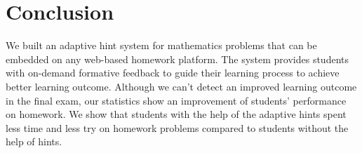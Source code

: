 \documentclass{llncs}
\begin{document}
\section{Conclusion}
We built an adaptive hint system for mathematics problems that can be embedded on any web-based homework platform. The system provides students with on-demand formative feedback to guide their learning process to achieve better learning outcome. Although we can't detect an improved learning outcome in the final exam, our statistics show an improvement of students' performance on homework. We show that students with the help of the adaptive hints spent less time and less try on homework problems compared to students without the help of hints.

\newpage


\end{document}

